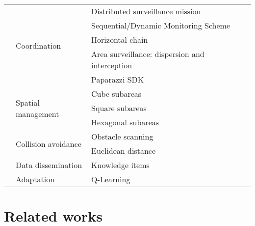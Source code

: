 \documentclass[journal]{IEEEtran}
\begin{document}
\begin{table*}[t]
\begin{center}
\begin{tabular}{ |l|l|l|l| }
     & \multirow{5}{*}{Coordination} 
     & Distributed surveillance mission & \cite{addsen} \\ \cline{3-4}
     & & Sequential/Dynamic Monitoring Scheme & \cite{airwise} \\ \cline{3-4}
     & & Horizontal chain & \cite{horswarm} \\ \cline{3-4}
     & & Area surveillance: dispersion and interception & \cite{cognitivesw} \\ \cline{3-4}
     & & Paparazzi SDK & \cite{paparazzi} \\ \cline{2-4}
     & \multirow{3}{*}{Spatial management} 
     & Cube subareas & \cite{airwise} \\ \cline{3-4}
     & & Square subareas & \cite{ragno} \cite{cognitivesw} \\ \cline{3-4}
     & & Hexagonal subareas & \cite{swarmtrack} \cite{addsen} \\ \cline{2-4}
     & \multirow{2}{*}{Collision avoidance}
     & Obstacle scanning & \cite{ragno} \\ \cline{3-4}
     & & Euclidean distance & \cite{collav} \\ \cline{2-4}
     & \multirow{1}{*}{Data dissemination}
     & Knowledge items & \cite{addsen} \\ \cline{2-4}
     & Adaptation & Q-Learning & \cite{addsen} \\ \hline
    \end{tabular}
    \end{center}
\end{table*}

\section{Related works}
\end{document}
